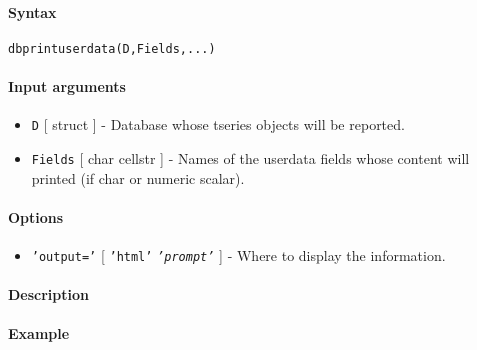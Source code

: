 


	\paragraph{Syntax}\label{syntax}

\begin{verbatim}
dbprintuserdata(D,Fields,...)
\end{verbatim}

\paragraph{Input arguments}\label{input-arguments}

\begin{itemize}
\item
  \texttt{D} {[} struct {]} - Database whose tseries objects will be
  reported.
\item
  \texttt{Fields} {[} char \textbar{} cellstr {]} - Names of the
  userdata fields whose content will printed (if char or numeric
  scalar).
\end{itemize}

\paragraph{Options}\label{options}

\begin{itemize}
\itemsep1pt\parskip0pt
\item
  \texttt{'output='} {[} \texttt{'html'} \textbar{}
  \emph{\texttt{'prompt'}} {]} - Where to display the information.
\end{itemize}

\paragraph{Description}\label{description}

\paragraph{Example}\label{example}


